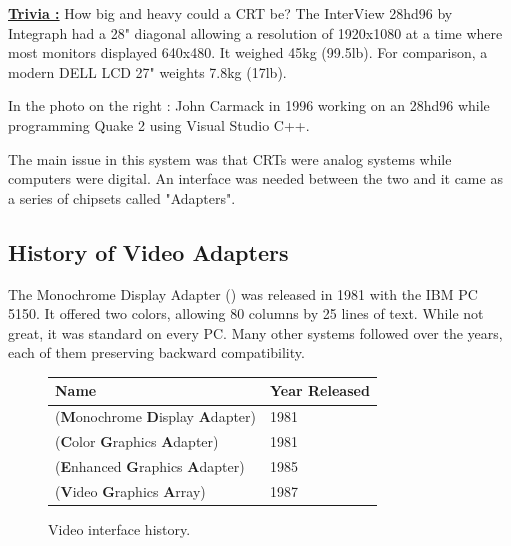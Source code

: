 \documentclass[book.tex]{subfiles}
\begin{document}
\begin{minipage}{.4\textwidth}
\textbf{\underline{Trivia :}} How big and heavy could a CRT be? The InterView 28hd96 by Integraph had a 28" diagonal allowing a resolution of 1920x1080 at a time where most monitors displayed 640x480. It weighed 45kg (99.5lb). For comparison, a modern DELL LCD 27" weights 7.8kg (17lb).\\
\par
In the photo on the right : John Carmack in 1996 working on an 28hd96 while programming Quake 2 using Visual Studio C++.\\
\end{minipage}
\begin{minipage}{.6\textwidth}
\begin{figure}[H]
  \begin{flushright}
       \vspace{-10pt}
    \end{flushright}
\end{figure}
\end{minipage}

\par
The main issue in this system was that CRTs were analog systems while computers were digital. An interface was needed between the two and it came as a series of chipsets called "Adapters". 

  \subsection{History of Video Adapters}

The Monochrome Display Adapter () was released in 1981 with the IBM PC 5150. It offered two colors, allowing 80 columns by 25 lines of text.  While not great, it was standard on every PC. Many other systems followed over the years, each of them preserving backward compatibility.
\bigskip
  
 \begin{figure}[H]
\centering  
\begin{tabularx}{\textwidth}{ X  Y }
  \toprule
  \textbf{Name} &  \textbf{Year Released} \\
  \toprule {}
   (\textbf{M}onochrome
   \textbf{D}isplay
   \textbf{A}dapter) & 1981 
   \\ 
   (\textbf{C}olor
   \textbf{G}raphics
   \textbf{A}dapter) & 1981 
    \\ 
   (\textbf{E}nhanced
   \textbf{G}raphics
   \textbf{A}dapter) & 1985
   \\ 
   (\textbf{V}ideo
   \textbf{G}raphics
   \textbf{A}rray)  & 1987
    \\
  \toprule
\end{tabularx}
\caption{Video interface history.}\label{fig:vga_history}
\end{figure}
\end{document}
